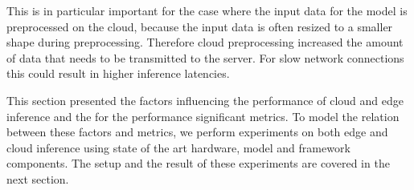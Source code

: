 This is in particular important for the case where the input data for the model is preprocessed on the cloud, because the input data is often resized to a smaller shape during preprocessing. Therefore cloud preprocessing increased the amount of data that needs to be transmitted to the server. For slow network connections this could result in higher inference latencies.




This section presented the factors influencing the performance of cloud and edge inference and the for the performance significant metrics.
To model the relation between these factors and metrics, we perform experiments on both edge and cloud inference using state of the art hardware, model and framework components. The setup and the result of these experiments are covered in the next section.
\endinput 